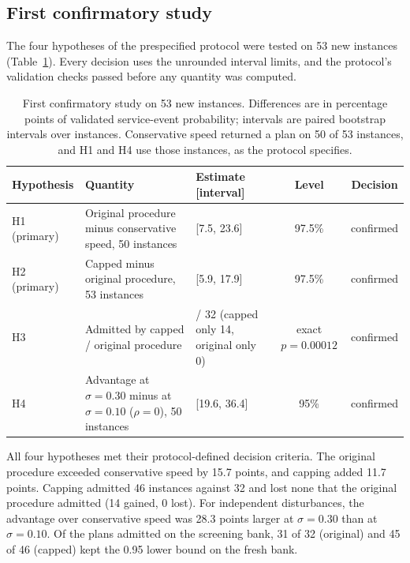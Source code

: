 \subsection{First confirmatory study}\label{sec:confirmatory}

The four hypotheses of the prespecified protocol were tested on 53 new instances (Table~\ref{tab:confirmatory}). Every decision uses the unrounded interval limits, and the protocol's validation checks passed before any quantity was computed.

\begin{table}[htbp]
\centering
\footnotesize
\caption{First confirmatory study on 53 new instances. Differences are in percentage points of validated service-event probability; intervals are paired bootstrap intervals over instances. Conservative speed returned a plan on 50 of 53 instances, and H1 and H4 use those instances, as the protocol specifies.}
\label{tab:confirmatory}
\begin{tabular}{@{}>{\raggedright\arraybackslash}p{1.9cm}>{\raggedright\arraybackslash}p{4.2cm}>{\raggedright\arraybackslash}p{3.5cm}cc@{}}
\toprule
Hypothesis & Quantity & Estimate [interval] & Level & Decision\\
\midrule
H1 (primary) & Original procedure minus conservative speed, 50 instances & 15.7 [7.5, 23.6] & 97.5\% & confirmed\\
H2 (primary) & Capped minus original procedure, 53 instances & 11.7 [5.9, 17.9] & 97.5\% & confirmed\\
H3 & Admitted by capped / original procedure & 46 / 32 (capped only 14, original only 0) & exact $p=0.00012$ & confirmed\\
H4 & Advantage at $\sigma=0.30$ minus at $\sigma=0.10$ ($\rho=0$), 50 instances & 28.3 [19.6, 36.4] & 95\% & confirmed\\
\bottomrule
\end{tabular}
\end{table}

All four hypotheses met their protocol-defined decision criteria. The original procedure exceeded conservative speed by 15.7 points, and capping added 11.7 points. Capping admitted 46 instances against 32 and lost none that the original procedure admitted (14 gained, 0 lost). For independent disturbances, the advantage over conservative speed was 28.3 points larger at $\sigma=0.30$ than at $\sigma=0.10$. Of the plans admitted on the screening bank, 31 of 32 (original) and 45 of 46 (capped) kept the 0.95 lower bound on the fresh bank.

